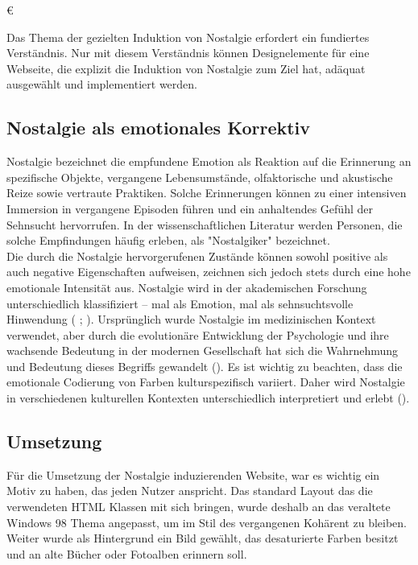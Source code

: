 €\documentclass[./dokumentation.tex]{subfiles}
\begin{document}
Das Thema der gezielten Induktion von Nostalgie erfordert ein fundiertes Verständnis. Nur mit diesem Verständnis können Designelemente für eine Webseite, die explizit die Induktion von Nostalgie zum Ziel hat, adäquat ausgewählt und implementiert werden.

\subsection{Nostalgie als emotionales Korrektiv}
Nostalgie bezeichnet die empfundene Emotion als Reaktion auf die Erinnerung an spezifische Objekte, vergangene Lebensumstände, olfaktorische und akustische Reize sowie vertraute Praktiken. Solche Erinnerungen können zu einer intensiven Immersion in vergangene Episoden führen und ein anhaltendes Gefühl der Sehnsucht hervorrufen. In der wissenschaftlichen Literatur werden Personen, die solche Empfindungen häufig erleben, als "Nostalgiker" bezeichnet. \\

Die durch die Nostalgie hervorgerufenen Zustände können sowohl positive als auch negative Eigenschaften aufweisen, zeichnen sich jedoch stets durch eine hohe emotionale Intensität aus. Nostalgie wird in der akademischen Forschung unterschiedlich klassifiziert – mal als Emotion, mal als sehnsuchtsvolle Hinwendung (\cite{Hepper2011} ; \cite{Stangl2023}). Ursprünglich wurde Nostalgie im medizinischen Kontext verwendet, aber durch die evolutionäre Entwicklung der Psychologie und ihre wachsende Bedeutung in der modernen Gesellschaft hat sich die Wahrnehmung und Bedeutung dieses Begriffs gewandelt (\cite{Stangl2023}). Es ist wichtig zu beachten, dass die emotionale Codierung von Farben kulturspezifisch variiert. Daher wird Nostalgie in verschiedenen kulturellen Kontexten unterschiedlich interpretiert und erlebt (\cite{Roberson2006}).\\

\subsection{Umsetzung}

Für die Umsetzung der Nostalgie induzierenden Website, war es wichtig ein Motiv zu haben, das jeden Nutzer anspricht. Das standard Layout das die verwendeten HTML Klassen mit sich bringen, wurde deshalb an das veraltete Windows 98 Thema angepasst, um im Stil des vergangenen Kohärent zu bleiben. Weiter wurde als Hintergrund ein Bild gewählt, das desaturierte Farben besitzt und an alte Bücher oder Fotoalben erinnern soll. 
\end{document}
